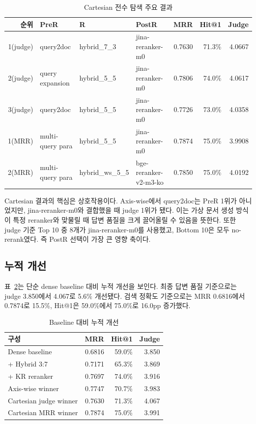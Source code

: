 \documentclass[10pt,a4paper,twocolumn]{article}
\begin{document}
\begin{table}[t]
\centering
\caption{Cartesian 전수 탐색 주요 결과}
\label{tab:cartesian}
\small
\begin{tabularx}{\textwidth}{r l l l r r r}
\toprule
순위 & PreR & R & PostR & MRR & Hit@1 & Judge \\
\midrule
1(judge) & query2doc & hybrid\_7\_3 & jina-reranker-m0 & 0.7630 & 71.3\% & 4.0667 \\
2(judge) & query expansion & hybrid\_5\_5 & jina-reranker-m0 & 0.7806 & 74.0\% & 4.0617 \\
3(judge) & query2doc & hybrid\_5\_5 & jina-reranker-m0 & 0.7726 & 73.0\% & 4.0358 \\
1(MRR) & multi-query para & hybrid\_5\_5 & jina-reranker-m0 & 0.7874 & 75.0\% & 3.9908 \\
2(MRR) & multi-query para & hybrid\_ws\_5\_5 & bge-reranker-v2-m3-ko & 0.7850 & 75.0\% & 4.0192 \\
\bottomrule
\end{tabularx}
\end{table}

Cartesian 결과의 핵심은 상호작용이다. Axis-wise에서 query2doc는 PreR 1위가 아니었지만, jina-reranker-m0와 결합했을 때 judge 1위가 됐다. 이는 가상 문서 생성 방식이 특정 reranker와 맞물릴 때 답변 품질을 크게 끌어올릴 수 있음을 뜻한다. 또한 judge 기준 Top 10 중 8개가 jina-reranker-m0를 사용했고, Bottom 10은 모두 no-rerank였다. 즉 PostR 선택이 가장 큰 영향 축이다.

\subsection{누적 개선}
표~\ref{tab:cumulative}는 단순 dense baseline 대비 누적 개선을 보인다. 최종 답변 품질 기준으로는 judge 3.850에서 4.067로 5.6\% 개선됐다. 검색 정확도 기준으로는 MRR 0.6816에서 0.7874로 15.5\%, Hit@1은 59.0\%에서 75.0\%로 16.0pp 증가했다.

\begin{table}[t]
\centering
\caption{Baseline 대비 누적 개선}
\label{tab:cumulative}
\small
\begin{tabular}{l r r r}
\toprule
구성 & MRR & Hit@1 & Judge \\
\midrule
Dense baseline & 0.6816 & 59.0\% & 3.850 \\
+ Hybrid 3:7 & 0.7171 & 65.3\% & 3.869 \\
+ KR reranker & 0.7697 & 74.0\% & 3.916 \\
Axis-wise winner & 0.7747 & 70.7\% & 3.983 \\
Cartesian judge winner & 0.7630 & 71.3\% & 4.067 \\
Cartesian MRR winner & 0.7874 & 75.0\% & 3.991 \\
\bottomrule
\end{tabular}
\end{table}
\end{document}
